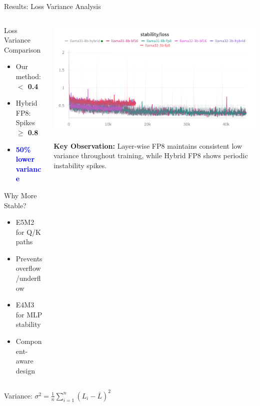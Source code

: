 \begin{frame}{Results: Loss Variance Analysis}

\begin{columns}[c]
\begin{column}{0.4\textwidth}
    \begin{block}{Loss Variance Comparison}
    
    \vspace{0.2cm}
    \begin{itemize}
        \item Our method: \textbf{$<$ 0.4}
        \item Hybrid FP8: Spikes \textbf{$\geq$ 0.8}
        \item \textcolor{blue}{\textbf{50\% lower variance}}
    \end{itemize}
    \end{block}

    \vspace{0.3cm}

    \begin{alertblock}{Why More Stable?}
    \begin{itemize}
        \item E5M2 for Q/K paths
        \item Prevents overflow/underflow
        \item E4M3 for MLP stability
        \item Component-aware design
    \end{itemize}
    \end{alertblock}
\end{column}

\begin{column}{0.60\textwidth}
    \centering
    \includegraphics[width=\textwidth]{figures/numeric_stability.png}

    \vspace{0.3cm}

    \small
    \textbf{Key Observation:} Layer-wise FP8 maintains consistent low variance throughout training, while Hybrid FP8 shows periodic instability spikes.
\end{column}
\end{columns}
\vspace{0.3cm}
\tiny
    Variance: $\sigma^2 = \frac{1}{n}\sum_{i=1}^{n}(L_i - \bar{L})^2$

\end{frame}
